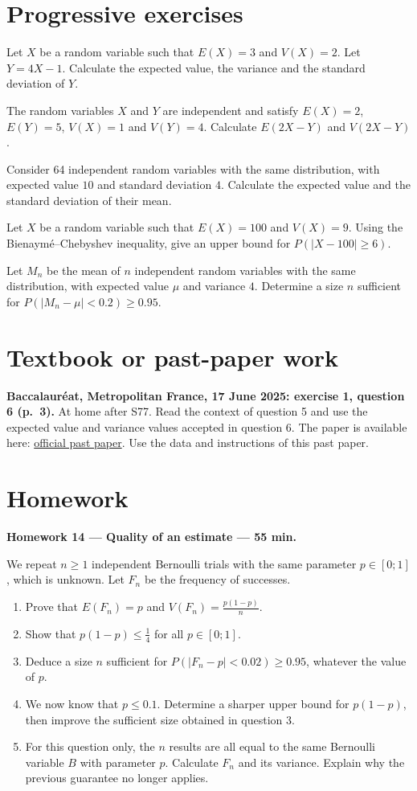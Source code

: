 \section{Progressive exercises}

Let $X$ be a random variable such that $E(X)=3$ and $V(X)=2$. Let $Y=4X-1$. Calculate the expected value, the variance and the standard deviation of $Y$.

The random variables $X$ and $Y$ are independent and satisfy $E(X)=2$, $E(Y)=5$, $V(X)=1$ and $V(Y)=4$. Calculate $E(2X-Y)$ and $V(2X-Y)$.

Consider 64 independent random variables with the same distribution, with expected value $10$ and standard deviation $4$. Calculate the expected value and the standard deviation of their mean.

Let $X$ be a random variable such that $E(X)=100$ and $V(X)=9$. Using the Bienaymé--Chebyshev inequality, give an upper bound for $P(|X-100|\ge6)$.

Let $M_n$ be the mean of $n$ independent random variables with the same distribution, with expected value $\mu$ and variance $4$. Determine a size $n$ sufficient for $P(|M_n-\mu|<0.2)\ge0.95$.

\section{Textbook or past-paper work}\textbf{Baccalauréat, Metropolitan France, 17 June 2025: exercise 1, question 6 (p.~3).} At home after S77. Read the context of question 5 and use the expected value and variance values accepted in question 6. The paper is available here: \href{https://www.education.gouv.fr/sites/default/files/2025-06/baccalaur-at-g-n-ral-2025-math-matiques-440856.pdf}{official past paper}. Use the data and instructions of this past paper.

\section{Homework}\textbf{Homework 14 --- Quality of an estimate --- 55 min.}\par We repeat $n\ge1$ independent Bernoulli trials with the same parameter $p\in[0;1]$, which is unknown. Let $F_n$ be the frequency of successes.
\begin{enumerate}\item Prove that $E(F_n)=p$ and $V(F_n)=\frac{p(1-p)}n$.
\item Show that $p(1-p)\le\frac14$ for all $p\in[0;1]$.
\item Deduce a size $n$ sufficient for $P(|F_n-p|<0.02)\ge0.95$, whatever the value of $p$.
\item We now know that $p\le0.1$. Determine a sharper upper bound for $p(1-p)$, then improve the sufficient size obtained in question 3.
\item For this question only, the $n$ results are all equal to the same Bernoulli variable $B$ with parameter $p$. Calculate $F_n$ and its variance. Explain why the previous guarantee no longer applies.\end{enumerate}

